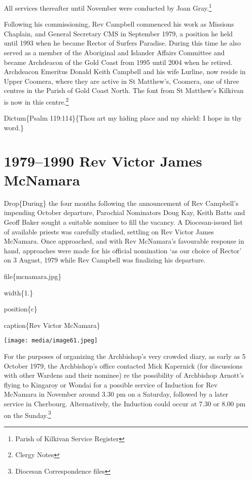All services thereafter until November were conducted by Joan Gray.\footnote{Parish of Kilkivan Service Register}

Following his commissioning, Rev Campbell commenced his work as Missions Chaplain, and General Secretary CMS in September 1979, a position he held until 1993 when he became Rector of Surfers Paradise. During this time he also served as a member of the Aboriginal and Islander Affairs Committee and became Archdeacon of the Gold Coast from 1995 until 2004 when he retired. Archdeacon Emeritus Donald Keith Campbell and his wife Lurline, now reside in Upper Coomera, where they are active in St Matthew's, Coomera, one of three centres in the Parish of Gold Coast North. The font from St Matthew's Kilkivan is now in this centre.\footnote{Clergy Notes}

Dictum\{Psalm 119:114\}\{Thou art my hiding place and my shield: I hope in thy word.\}

\hypertarget{rev-victor-james-mcnamara}{%
\chapter{1979--1990 Rev Victor James McNamara}\label{rev-victor-james-mcnamara}}

Drop\{During\} the four months following the announcement of Rev Campbell's impending October departure, Parochial Nominators Doug Kay, Keith Batts and Geoff Baker sought a suitable nominee to fill the vacancy. A Diocesan-issued list of available priests was carefully studied, settling on Rev Victor James McNamara. Once approached, and with Rev McNamara's favourable response in hand, approaches were made for his official nomination `as our choice of Rector' on 3 August, 1979 while Rev Campbell was finalizing his departure.

file\{mcnamara.jpg\}

width\{1.\}

position\{c\}

caption\{Rev Victor McNamara\}

\texttt{[image: media/image61.jpeg]}

For the purposes of organizing the Archbishop's very crowded diary, as early as 5 October 1979, the Archbishop's office contacted Mick Kapernick (for discussions with other Wardens and their nominee) re the possibility of Archbishop Arnott's flying to Kingaroy or Wondai for a possible service of Induction for Rev McNamara in November around 3.30 pm on a Saturday, followed by a later service in Cherbourg. Alternatively, the Induction could occur at 7.30 or 8.00 pm on the Sunday.\footnote{Diocesan Correspondence files}

